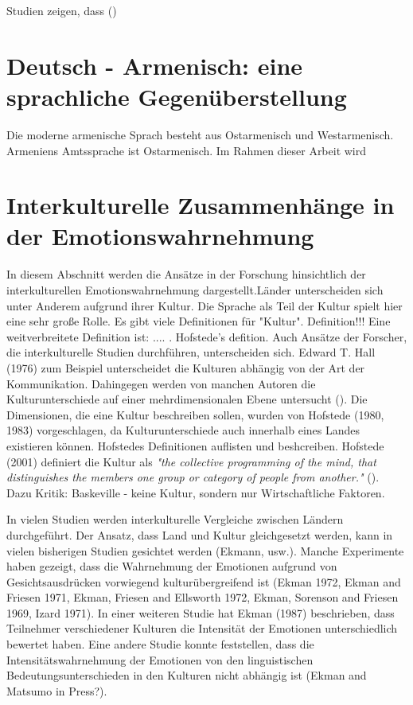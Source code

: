 \documentclass[11pt,a4paper,headsepline,twoside,toc=bibliography]{scrreprt}
\begin{document}
Studien zeigen, dass (\cite{Pell2020})


\section{Deutsch - Armenisch: eine sprachliche Gegenüberstellung}
\label{sec:language_description}
Die moderne armenische Sprach besteht aus Ostarmenisch und Westarmenisch. Armeniens Amtssprache ist Ostarmenisch. Im Rahmen dieser Arbeit wird 


\section{Interkulturelle Zusammenhänge in der Emotionswahrnehmung}
\label{sec:crosscultural_emotion}

In diesem Abschnitt werden die Ansätze in der Forschung hinsichtlich der interkulturellen Emotionswahrnehmung dargestellt.Länder unterscheiden sich unter Anderem aufgrund ihrer Kultur. Die Sprache als Teil der Kultur spielt hier eine sehr große Rolle. Es gibt viele Definitionen für "Kultur". Definition!!! Eine weitverbreitete Definition ist: .... . Hofstede's defition. Auch Ansätze der Forscher, die interkulturelle Studien durchführen, unterscheiden sich. Edward T. Hall (1976) zum Beispiel unterscheidet die Kulturen abhängig von der Art der Kommunikation. Dahingegen werden von manchen Autoren die Kulturunterschiede auf einer mehrdimensionalen Ebene untersucht (\cite{Matsumoto}). Die Dimensionen, die eine Kultur beschreiben sollen, wurden von Hofstede (1980, 1983) vorgeschlagen, da Kulturunterschiede auch innerhalb eines Landes existieren können. Hofstedes Definitionen auflisten und beshcreiben. Hofstede (2001) definiert die Kultur als \emph{"the collective programming of the mind, that distinguishes the members one group or category of people from another."} (). Dazu Kritik: Baskeville - keine Kultur, sondern nur Wirtschaftliche Faktoren. 


In vielen Studien werden interkulturelle Vergleiche zwischen Ländern durchgeführt. Der Ansatz, dass Land und Kultur gleichgesetzt werden, kann in vielen bisherigen Studien gesichtet werden (Ekmann, usw.). Manche Experimente haben gezeigt, dass die Wahrnehmung der Emotionen aufgrund von Gesichtsausdrücken vorwiegend kulturübergreifend ist (Ekman 1972, Ekman and Friesen 1971, Ekman, Friesen and Ellsworth 1972, Ekman, Sorenson and Friesen 1969, Izard 1971). In einer weiteren Studie hat Ekman (1987) beschrieben, dass Teilnehmer verschiedener Kulturen die Intensität der Emotionen unterschiedlich bewertet haben. Eine andere Studie konnte feststellen, dass die Intensitätswahrnehmung der Emotionen von den linguistischen Bedeutungsunterschieden in den Kulturen nicht abhängig ist (Ekman and Matsumo in Press?). 
\end{document}
